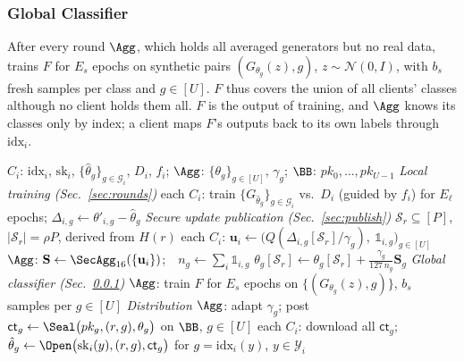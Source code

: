 \subsubsection{Global Classifier}
\label{sec:full}
After every round $\Agg$, which holds all averaged generators but no real data, trains $F$ for $E_s$
epochs on synthetic pairs $(G_{\theta_g}(z),g)$, $z\sim\mathcal{N}(0,I)$, with $b_s$ fresh samples
per class and $g\in[U]$. $F$ thus covers the union of all clients' classes although no client holds
them all. $F$ is the output of training, and $\Agg$ knows its classes only by index; a client maps
$F$'s outputs back to its own labels through $\mathrm{idx}_i$.

\begin{algorithm}[t]
\caption{Online phase: training round $r=1,\dots,R$ (Fig.~\ref{fig:round})}
\label{alg:round}
\begin{algorithmic}[1]
\Require $C_i$: $\mathrm{idx}_i$, $\mathrm{sk}_i$, $\{\hat\theta_g\}_{g\in\mathcal{G}_i}$, $D_i$, $f_i$; $\Agg$: $\{\theta_g\}_{g\in[U]}$, $\gamma_g$; $\BB$: $pk_0,\dots,pk_{U-1}$
\Statex \textit{Local training (Sec.~\ref{sec:rounds})}
\State each $C_i$: train $\{G_{\hat\theta_g}\}_{g\in\mathcal{G}_i}$ vs.\ $D_i$ (guided by $f_i$) for $E_\ell$ epochs; $\Delta_{i,g}\gets\theta'_{i,g}-\hat\theta_g$
\Statex \textit{Secure update publication (Sec.~\ref{sec:publish})}
\State $\mathcal{S}_r\subseteq[P]$, $|\mathcal{S}_r|=\rho P$, derived from $H(r)$ 
\State each $C_i$: $\mathbf{u}_i\gets\big(Q(\Delta_{i,g}[\mathcal{S}_r]/\gamma_g),\ \mathbb{1}_{i,g}\big)_{g\in[U]}$ 
\State $\Agg$: $\mathbf{S}\gets\SecAgg_{16}(\{\mathbf{u}_i\})$;\ \ $n_g\gets\sum_i\mathbb{1}_{i,g}$
  \State $\theta_g[\mathcal{S}_r]\gets\theta_g[\mathcal{S}_r]+\frac{\gamma_g}{127\,n_g}\mathbf{S}_g$ 
\EndFor
\Statex \textit{Global classifier (Sec.~\ref{sec:full})}
\State $\Agg$: train $F$ for $E_s$ epochs on $\{(G_{\theta_g}(z),g)\}$, $b_s$ samples per $g\in[U]$
\Statex \textit{Distribution}
\State $\Agg$: adapt $\gamma_g$; post $\mathsf{ct}_g\gets\Seal\big(pk_g,(r,g),\theta_g\big)$ on $\BB$, $g\in[U]$
\State each $C_i$: download all $\mathsf{ct}_g$; $\hat\theta_g\gets\Open\big(\mathrm{sk}_i(y),(r,g),\mathsf{ct}_g\big)$ for $g=\mathrm{idx}_i(y)$, $y\in\mathcal{Y}_i$
\end{algorithmic}
\end{algorithm}
